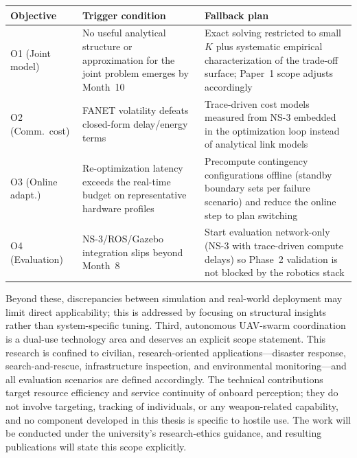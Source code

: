 \begin{table}[H]
\centering
\footnotesize
\renewcommand{\arraystretch}{1.25}
\begin{tabularx}{\textwidth}{@{} l X X @{}}
\toprule
\textbf{Objective} & \textbf{Trigger condition} & \textbf{Fallback plan} \\
\midrule
O1 (Joint model) & No useful analytical structure or approximation for the joint problem emerges by Month~10 & Exact solving restricted to small $K$ plus systematic empirical characterization of the trade-off surface; Paper~1 scope adjusts accordingly \\
O2 (Comm.\ cost) & FANET volatility defeats closed-form delay/energy terms & Trace-driven cost models measured from NS-3 embedded in the optimization loop instead of analytical link models \\
O3 (Online adapt.) & Re-optimization latency exceeds the real-time budget on representative hardware profiles & Precompute contingency configurations offline (standby boundary sets per failure scenario) and reduce the online step to plan switching \\
O4 (Evaluation) & NS-3/ROS/Gazebo integration slips beyond Month~8 & Start evaluation network-only (NS-3 with trace-driven compute delays) so Phase~2 validation is not blocked by the robotics stack \\
\bottomrule
\end{tabularx}
\end{table}

Beyond these, discrepancies between simulation and real-world deployment may limit direct applicability; this is addressed by focusing on structural insights rather than system-specific tuning. Third, autonomous UAV-swarm coordination is a dual-use technology area and deserves an explicit scope statement. This research is confined to civilian, research-oriented applications---disaster response, search-and-rescue, infrastructure inspection, and environmental monitoring---and all evaluation scenarios are defined accordingly. The technical contributions target resource efficiency and service continuity of onboard perception; they do not involve targeting, tracking of individuals, or any weapon-related capability, and no component developed in this thesis is specific to hostile use. The work will be conducted under the university's research-ethics guidance, and resulting publications will state this scope explicitly.
